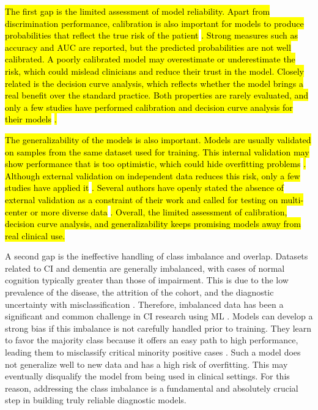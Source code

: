\hl{The first gap is the limited assessment of model reliability. Apart from discrimination performance, calibration is also important for models to produce probabilities that reflect the true risk of the patient} \cite{VanCalster2019Calibration}\hl{. Strong measures such as accuracy and AUC are reported, but the predicted probabilities are not well calibrated. A poorly calibrated model may overestimate or underestimate the risk, which could mislead clinicians and reduce their trust in the model. Closely related is the decision curve analysis, which reflects whether the model brings a real benefit over the standard practice. Both properties are rarely evaluated, and only a few studies have performed calibration and decision curve analysis for their models} \cite{Cui2024Prediction, Georgiev2024Predicting, Li2023Machine, Twait2023Dementia}\hl{.}

\hl{The generalizability of the models is also important. Models are usually validated on samples from the same dataset used for training. This internal validation may show performance that is too optimistic, which could hide overfitting problems} \cite{Vermeulen2025Limited}\hl{. Although external validation on independent data reduces this risk, only a few studies have applied it} \cite{abbas2024Explainable, Sharma2024Leveraging, Cui2024Prediction}\hl{. Several authors have openly stated the absence of external validation as a constraint of their work and called for testing on multi-center or more diverse data} \cite{Garcia2022Diagnosis, Georgiev2024Predicting, Li2023Early, Twait2023Dementia}\hl{. Overall, the limited assessment of calibration, decision curve analysis, and generalizability keeps promising models away from real clinical use.}

A second gap is the ineffective handling of class imbalance and overlap. Datasets related to CI and dementia are generally imbalanced, with cases of normal cognition typically greater than those of impairment. This is due to the low prevalence of the disease, the attrition of the cohort, and the diagnostic uncertainty with misclassification \cite{Wang2024Understanding}. Therefore, imbalanced data has been a significant and common challenge in CI research using ML \cite{Salmi2024Handling}. Models can develop a strong bias if this imbalance is not carefully handled prior to training. They learn to favor the majority class because it offers an easy path to high performance, leading them to misclassify critical minority positive cases \cite{Salmi2024Handling}. Such a model does not generalize well to new data and has a high risk of overfitting. This may eventually disqualify the model from being used in clinical settings. For this reason, addressing the class imbalance is a fundamental and absolutely crucial step in building truly reliable diagnostic models.

